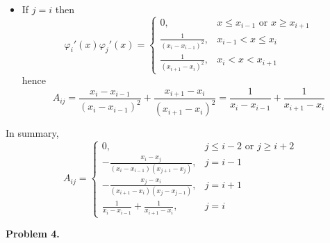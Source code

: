 \documentclass{article}
\def\tbf#1{\textbf{#1}}
\newcommand{\vp}{\varphi}
\begin{document}
\begin{enumerate}[label=(\alph*)]
\begin{itemize}
	\item If $j=i$ then
	$$\vp_i'(x)\vp_j'(x) =
	\begin{cases}
		0, & x\le x_{i-1} \text{ or } x\ge x_{i+1}\\
		\frac{1}{(x_i-x_{i-1})^2}, & x_{i-1}<x\le x_i\\
		\frac{1}{(x_{i+1}-x_i)^2}, & x_i<x<x_{i+1}
	\end{cases}$$
	hence
	$$A_{ij} = \frac{x_i-x_{i-1}}{(x_i-x_{i-1})^2} + \frac{x_{i+1}-x_i}{(x_{i+1}-x_i)^2}
	= \frac{1}{x_i-x_{i-1}} + \frac{1}{x_{i+1}-x_i}$$
	
\end{itemize}
In summary,
$$A_{ij} = 
\begin{cases}
	0, & j\le i-2 \text{ or } j\ge i+2\\
	-\frac{x_i-x_j}{(x_i-x_{i-1})(x_{j+1}-x_j)}, & j=i-1\\
	-\frac{x_j-x_i}{(x_{i+1}-x_{i})(x_{j}-x_{j-1})}, & j=i+1\\
	\frac{1}{x_i-x_{i-1}} + \frac{1}{x_{i+1}-x_i}, & j=i
\end{cases}$$

\end{enumerate}


\tbf{Problem 4.}
\end{document}
